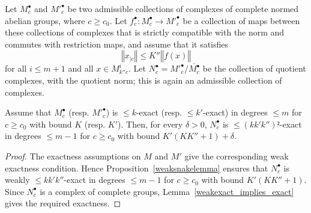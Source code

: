 \begin{proposition}
  \label{snakelemma}
  Let $M^\bullet_c$ and $M'^\bullet_c$ be two admissible collections
  of complexes of complete normed abelian groups, where $c\geq c_0$.
  Let $f^\bullet_c: M^\bullet_c\to M'^\bullet_c$ be a collection of maps
  between these collections of complexes
  that is strictly compatible with the norm and commutes with restriction maps,
  and assume that it satisfies
  \[
    ‖x_{|c}‖ ≤ K''‖f(x)‖
  \]
  for all $i ≤ m+1$ and all $x\in M^i_{k''c}$.
  Let $N^\bullet_c=M'^\bullet_c/\overline{M^\bullet_c}$
  be the collection of quotient complexes, with the quotient norm;
  this is again an admissible collection of complexes.

  Assume that $M^\bullet_c$ (resp. $M'^\bullet_c$) is $\leq k$-exact
  (resp. $≤ k'$-exact) in degrees $\leq m$ for $c\geq c_0$ with bound $K$
  (resp. $K'$).
  Then, for every $δ > 0$, $N^\bullet_c$ is $\leq (kk'k'')²$-exact in
  degrees $\leq m-1$ for $c\geq c_0$
  with bound $K'(KK'' + 1) + δ$.
\end{proposition}

\begin{proof}
  The exactness assumptions on $M$ and $M'$ give the corresponding
  weak exactness condition. Hence Proposition~\ref{weaksnakelemma}
  ensures that $N^\bullet_c$ is weakly $\leq kk'k''$-exact in degrees
  $\leq m-1$ for $c\geq c_0$ with bound $K'(KK'' + 1)$.
  Since $N^\bullet_c$ is a complex of complete groups,
  Lemma~\ref{weakexact_implies_exact} gives the required exactness.
\end{proof}




